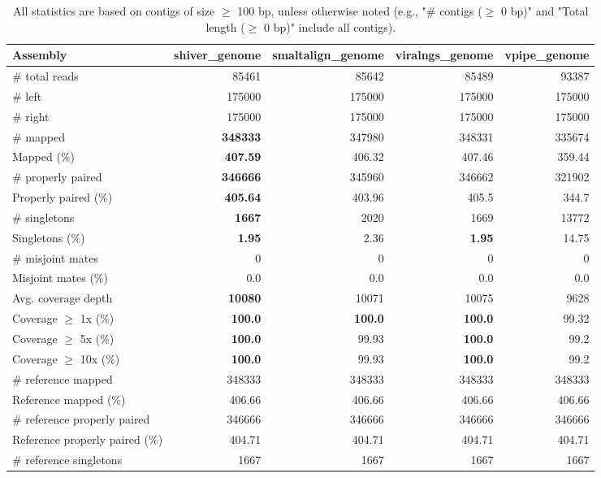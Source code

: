 \documentclass[12pt,a4paper]{article}
\begin{document}
\begin{table}[ht]
\begin{center}
\caption{All statistics are based on contigs of size $\geq$ 100 bp, unless otherwise noted (e.g., "\# contigs ($\geq$ 0 bp)" and "Total length ($\geq$ 0 bp)" include all contigs).}
\begin{tabular}{|l*{4}{|r}|}
\hline
Assembly & shiver\_genome & smaltalign\_genome & viralngs\_genome & vpipe\_genome \\ \hline
\# total reads & 85461 & 85642 & 85489 & 93387 \\ \hline
\# left & 175000 & 175000 & 175000 & 175000 \\ \hline
\# right & 175000 & 175000 & 175000 & 175000 \\ \hline
\# mapped & {\bf 348333} & 347980 & 348331 & 335674 \\ \hline
Mapped (\%) & {\bf 407.59} & 406.32 & 407.46 & 359.44 \\ \hline
\# properly paired & {\bf 346666} & 345960 & 346662 & 321902 \\ \hline
Properly paired (\%) & {\bf 405.64} & 403.96 & 405.5 & 344.7 \\ \hline
\# singletons & {\bf 1667} & 2020 & 1669 & 13772 \\ \hline
Singletons (\%) & {\bf 1.95} & 2.36 & {\bf 1.95} & 14.75 \\ \hline
\# misjoint mates & 0 & 0 & 0 & 0 \\ \hline
Misjoint mates (\%) & 0.0 & 0.0 & 0.0 & 0.0 \\ \hline
Avg. coverage depth & {\bf 10080} & 10071 & 10075 & 9628 \\ \hline
Coverage $\geq$ 1x (\%) & {\bf 100.0} & {\bf 100.0} & {\bf 100.0} & 99.32 \\ \hline
Coverage $\geq$ 5x (\%) & {\bf 100.0} & 99.93 & {\bf 100.0} & 99.2 \\ \hline
Coverage $\geq$ 10x (\%) & {\bf 100.0} & 99.93 & {\bf 100.0} & 99.2 \\ \hline
\# reference mapped & 348333 & 348333 & 348333 & 348333 \\ \hline
Reference mapped (\%) & 406.66 & 406.66 & 406.66 & 406.66 \\ \hline
\# reference properly paired & 346666 & 346666 & 346666 & 346666 \\ \hline
Reference properly paired (\%) & 404.71 & 404.71 & 404.71 & 404.71 \\ \hline
\# reference singletons & 1667 & 1667 & 1667 & 1667 \\ \hline

\end{tabular}
\end{center}
\end{table}
\end{document}
